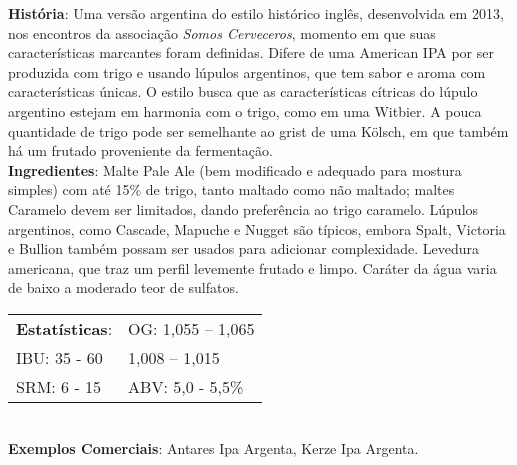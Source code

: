 \textbf{História}: Uma versão argentina do estilo histórico inglês, desenvolvida em 2013, nos encontros da associação \textit{Somos Cerveceros}, momento em que suas características marcantes foram definidas. Difere de uma American IPA por ser produzida com trigo e usando lúpulos argentinos, que tem sabor e aroma com características únicas. O estilo busca que as características cítricas do lúpulo argentino estejam em harmonia com o trigo, como em uma Witbier. A pouca quantidade de trigo pode ser semelhante ao grist de uma Kölsch, em que também há um frutado proveniente da fermentação. \\
\textbf{Ingredientes}: Malte Pale Ale (bem modificado e adequado para mostura simples) com até 15\% de trigo, tanto maltado como não maltado; maltes Caramelo devem ser limitados, dando preferência ao trigo caramelo. Lúpulos argentinos, como Cascade, Mapuche e Nugget são típicos, embora Spalt, Victoria e Bullion também possam ser usados para adicionar complexidade. Levedura americana, que traz um perfil levemente frutado e limpo. Caráter da água varia de baixo a moderado teor de sulfatos. \\
\begin{tabular}{@{}p{35mm}p{35mm}@{}}
  \textbf{Estatísticas}: & OG: 1,055 – 1,065 \\
  IBU: 35 - 60 & 1,008 – 1,015 \\
  SRM: 6 - 15 & ABV: 5,0 - 5,5\%
\end{tabular}\\
\textbf{Exemplos Comerciais}: Antares Ipa Argenta, Kerze Ipa Argenta.
